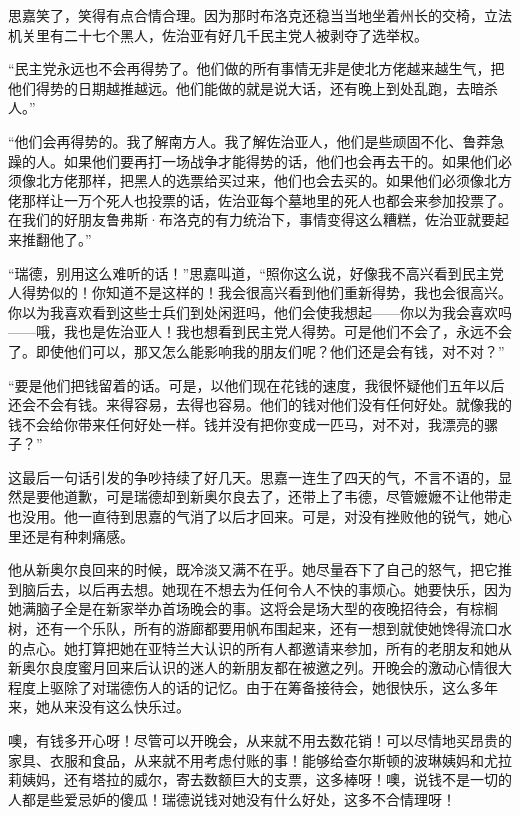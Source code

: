 \par 思嘉笑了，笑得有点合情合理。因为那时布洛克还稳当当地坐着州长的交椅，立法机关里有二十七个黑人，佐治亚有好几千民主党人被剥夺了选举权。
\par “民主党永远也不会再得势了。他们做的所有事情无非是使北方佬越来越生气，把他们得势的日期越推越远。他们能做的就是说大话，还有晚上到处乱跑，去暗杀人。”
\par “他们会再得势的。我了解南方人。我了解佐治亚人，他们是些顽固不化、鲁莽急躁的人。如果他们要再打一场战争才能得势的话，他们也会再去干的。如果他们必须像北方佬那样，把黑人的选票给买过来，他们也会去买的。如果他们必须像北方佬那样让一万个死人也投票的话，佐治亚每个墓地里的死人也都会来参加投票了。在我们的好朋友鲁弗斯·布洛克的有力统治下，事情变得这么糟糕，佐治亚就要起来推翻他了。”
\par “瑞德，别用这么难听的话！”思嘉叫道，“照你这么说，好像我不高兴看到民主党人得势似的！你知道不是这样的！我会很高兴看到他们重新得势，我也会很高兴。你以为我喜欢看到这些士兵们到处闲逛吗，他们会使我想起——你以为我会喜欢吗——哦，我也是佐治亚人！我也想看到民主党人得势。可是他们不会了，永远不会了。即使他们可以，那又怎么能影响我的朋友们呢？他们还是会有钱，对不对？”
\par “要是他们把钱留着的话。可是，以他们现在花钱的速度，我很怀疑他们五年以后还会不会有钱。来得容易，去得也容易。他们的钱对他们没有任何好处。就像我的钱不会给你带来任何好处一样。钱并没有把你变成一匹马，对不对，我漂亮的骡子？”
\par 这最后一句话引发的争吵持续了好几天。思嘉一连生了四天的气，不言不语的，显然是要他道歉，可是瑞德却到新奥尔良去了，还带上了韦德，尽管嬷嬷不让他带走也没用。他一直待到思嘉的气消了以后才回来。可是，对没有挫败他的锐气，她心里还是有种刺痛感。
\par 他从新奥尔良回来的时候，既冷淡又满不在乎。她尽量吞下了自己的怒气，把它推到脑后去，以后再去想。她现在不想去为任何令人不快的事烦心。她要快乐，因为她满脑子全是在新家举办首场晚会的事。这将会是场大型的夜晚招待会，有棕榈树，还有一个乐队，所有的游廊都要用帆布围起来，还有一想到就使她馋得流口水的点心。她打算把她在亚特兰大认识的所有人都邀请来参加，所有的老朋友和她从新奥尔良度蜜月回来后认识的迷人的新朋友都在被邀之列。开晚会的激动心情很大程度上驱除了对瑞德伤人的话的记忆。由于在筹备接待会，她很快乐，这么多年来，她从来没有这么快乐过。
\par 噢，有钱多开心呀！尽管可以开晚会，从来就不用去数花销！可以尽情地买昂贵的家具、衣服和食品，从来就不用考虑付账的事！能够给查尔斯顿的波琳姨妈和尤拉莉姨妈，还有塔拉的威尔，寄去数额巨大的支票，这多棒呀！噢，说钱不是一切的人都是些爱忌妒的傻瓜！瑞德说钱对她没有什么好处，这多不合情理呀！
